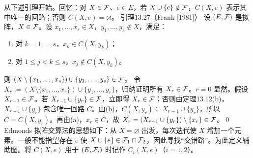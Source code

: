 从下述引理开始。回忆：对 $X\in\mathcal F$、$e\in E$，若 $X\cup\{e\}\notin\mathcal F$，$C(X,e)$ 表示其中唯一的回路；否则 $C(X,e)=\varnothing$。
\st{引理13.27（Frank [1981]）} 设 $(E,\mathcal F)$ 是拟阵，$X\in\mathcal F$。设 $x_1,\ldots,x_s\in X$，$y_1,\ldots,y_s\notin X$，满足：
\begin{enumerate}[label=(\alph*)]
\item 对 $k=1,\ldots,s$，$x_k\in C(X,y_k)$；
\item 对 $1\le j<k\le s$，$x_j\notin C(X,y_k)$。
\end{enumerate}
则 $(X\setminus\{x_1,\ldots,x_s\})\cup\{y_1,\ldots,y_s\}\in\mathcal F$。
\pr 令 $X_r:=(X\setminus\{x_1,\ldots,x_r\})\cup\{y_1,\ldots,y_r\}$，归纳证明所有 $X_r\in\mathcal F$。$r=0$ 显然。假设 $X_{r-1}\in\mathcal F$。若 $X_{r-1}\cup\{y_r\}\in\mathcal F$，立即得 $X_r\in\mathcal F$；否则由定理13.12(b)，$X_{r-1}\cup\{y_r\}$ 包含唯一回路 $C$。由(b)，$C(X,y_r)\subseteq X_{r-1}\cup\{y_r\}$，所以 $C=C(X,y_r)$。再由(a)，$x_r\in C$，故 $X_r=(X_{r-1}\cup\{y_r\})\setminus\{x_r\}\in\mathcal F$。\qed
Edmonds 拟阵交算法的思想如下：从 $X=\varnothing$ 出发，每次迭代使 $X$ 增加一个元素。一般不能指望存在 $e$ 使 $X\cup\{e\}\in\mathcal F_1\cap\mathcal F_2$，因此寻找“交错路”。为此定义辅助图。将 $C(X,e)$ 用于 $(E,\mathcal F_i)$ 时记作 $C_i(X,e)$（$i=1,2$）。

